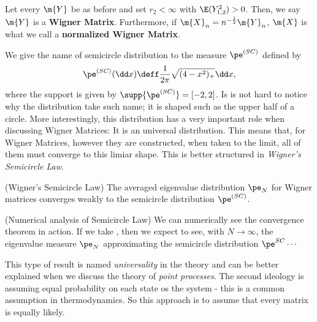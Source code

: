 \begin{definicao}
	Let every $\m{Y}$ be as before and set $r_2 < \infty$ with $\E(Y_{1,2}^2) > 0$. Then, we say $\m{Y}$ is a \textbf{Wigner Matrix}. Furthermore, if $\m{X}_n = n^{-\frac{1}{2}} \m{Y}_n$, $\m{X}$ is what we call a \textbf{normalized Wigner Matrix}.
	\label{Definition: Wigner Matrix}
\end{definicao}

We give the name of semicircle distribution to the measure $\pe^{(SC)}$ defined by 
\begin{equation}
	\pe^{(SC)}(\dd x) \deff \frac{1}{2\pi} \sqrt{(4 - x^2)_{+}} \dd x,
\end{equation} 
where the support is given by $\supp{\pe^{(SC)}} = [-2, 2]$. Is is not hard to notice why the distribution take such name; it is shaped such as the upper half of a circle. More interestingly, this distribution has a very important role when discussing Wigner Matrices: It is an universal distribution. This means that, for Wigner Matrices, however they are constructed, when taken to the limit, all of them must converge to this limiar shape. This is better structured in \textit{Wigner's Semicircle Law}.

\begin{teorema} (Wigner's Semicircle Law)
	The averaged eigenvalue distribution $\pe_N$ for Wigner matrices converges weakly to the semicircle distribution $\pe^{(SC)}$.
\end{teorema}

\begin{exemplo} (Numerical analysis of Semicircle Law)
	We can numerically see the convergence theorem in action. If we take , then we expect to see, with $N \rightarrow \infty$, the eigenvalue measure $\pe_N$ approximating the semicircle distribution $\pe^{SC} \cdots$
\end{exemplo}

This type of result is named \textit{universality} in the theory and can be better explained when we discuss the theory of \textit{point processes}. The second ideology is assuming equal probability on each state os the system - this is a common assumption in thermodynamics.  So this approach is to assume that every matrix is equally likely. 


